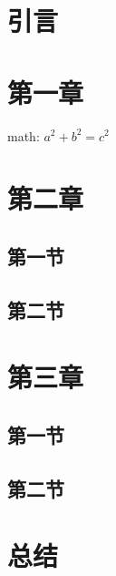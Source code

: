 \documentclass[12pt,hyperref,a4paper,UTF8]{ctexart}
\begin{document}
\cover

\begin{abstract}
\fangsong

\end{abstract}

\begin{keywords}

\end{keywords}
\begin{abstract}

\end{abstract}

\begin{keywords_En}

\end{keywords_En}

\thispagestyle{empty} %

\newpage
\tableofcontents

\newpage


\section{引言}


\section{第一章}
math: $a^2 + b^2 = c^2$
\section{第二章}
\subsection{第一节}
\subsection{第二节}
\section{第三章}
\subsection{第一节}
\subsection{第二节}
\section{总结}

\newpage
\end{document}
